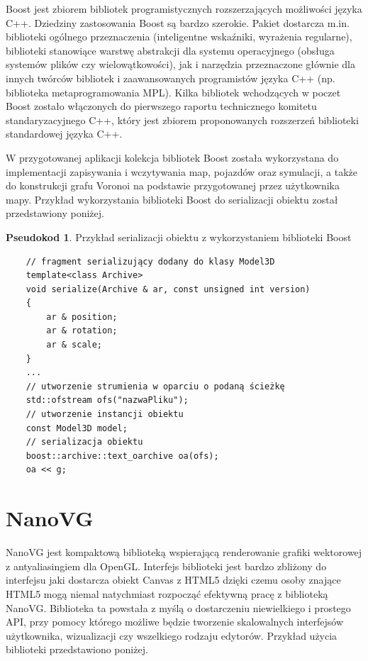 \documentclass[a4paper,11pt,twoside]{report}
\theoremstyle{definition}
\newtheorem{pseudokod}{Pseudokod}[subsection]
\begin{document}
Boost jest zbiorem bibliotek programistycznych rozszerzających możliwości języka C++. Dziedziny zastosowania Boost są bardzo szerokie. Pakiet dostarcza m.in. biblioteki ogólnego przeznaczenia (inteligentne wskaźniki, wyrażenia regularne), biblioteki stanowiące warstwę abstrakcji dla systemu operacyjnego (obsługa systemów plików czy wielowątkowości), jak i narzędzia przeznaczone głównie dla innych twórców bibliotek i zaawansowanych programistów języka C++ (np. biblioteka metaprogramowania MPL). Kilka bibliotek wchodzących w poczet Boost zostało włączonych do pierwszego raportu technicznego komitetu standaryzacyjnego C++, który jest zbiorem proponowanych rozszerzeń biblioteki standardowej języka C++. 

W przygotowanej aplikacji kolekcja bibliotek Boost została wykorzystana do implementacji zapisywania i wczytywania map, pojazdów oraz symulacji, a także do konstrukcji grafu Voronoi na podstawie przygotowanej przez użytkownika mapy.  Przykład wykorzystania biblioteki Boost do serializacji obiektu został przedstawiony poniżej.

\begin{pseudokod}
Przykład serializacji obiektu z wykorzystaniem biblioteki Boost
\begin{verbatim}
    // fragment serializujący dodany do klasy Model3D
    template<class Archive>
    void serialize(Archive & ar, const unsigned int version)
    {
        ar & position;
        ar & rotation;
        ar & scale;
    }
    ...
    // utworzenie strumienia w oparciu o podaną ścieżkę
    std::ofstream ofs("nazwaPliku");
    // utworzenie instancji obiektu
    const Model3D model;
    // serializacja obiektu 
    boost::archive::text_oarchive oa(ofs);
    oa << g;
\end{verbatim}
\end{pseudokod}

\section{NanoVG}

NanoVG jest kompaktową biblioteką wspierającą renderowanie grafiki wektorowej z antyaliasingiem dla OpenGL. Interfejs biblioteki jest bardzo zbliżony do interfejsu jaki dostarcza obiekt Canvas z HTML5 dzięki czemu osoby znające HTML5 mogą niemal natychmiast rozpocząć efektywną pracę z biblioteką NanoVG. Biblioteka ta powstała z myślą o dostarczeniu niewielkiego i prostego API, przy pomocy którego możliwe będzie tworzenie skalowalnych interfejsów użytkownika, wizualizacji czy wszelkiego rodzaju edytorów. Przykład użycia biblioteki przedstawiono poniżej.
\end{document}
